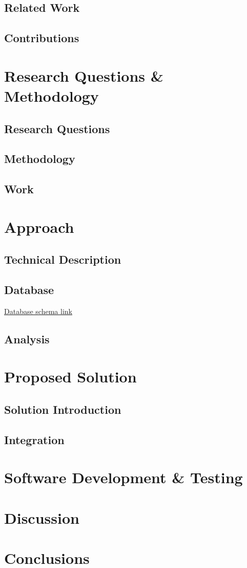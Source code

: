 \documentclass{cslthse-msc}
\begin{document}
\section{Related Work}
\section{Contributions}

\chapter{Research Questions \& Methodology}
\section{Research Questions}
\section{Methodology}
\section{Work}

\chapter{Approach}
\section{Technical Description}
\section{Database}
\href{https://drive.google.com/file/d/0B1IYTmE2hnD-eGQ0N2tvYXZNNVE/view?usp=sharing}{Database schema link}

\section{Analysis}

\chapter{Proposed Solution}
\section{Solution Introduction}
\section{Integration}

\chapter{Software Development \& Testing}

\chapter{Discussion}

\chapter{Conclusions}



\end{document}
